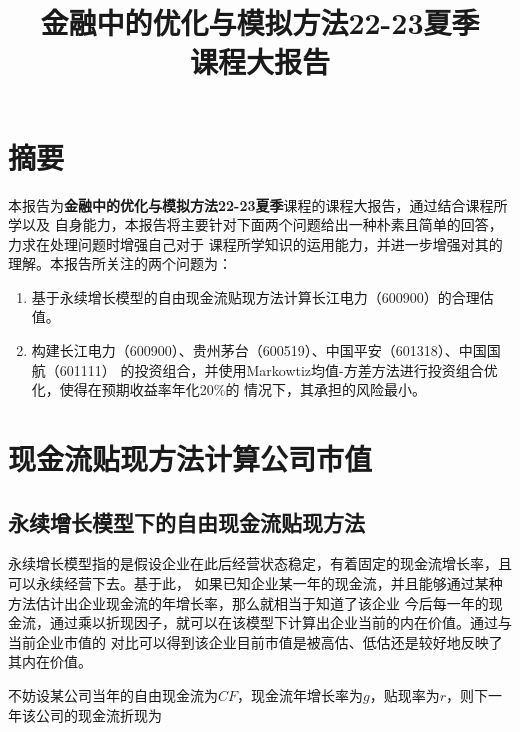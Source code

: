\documentclass[UTF8]{ctexart}
\numberwithin{figure}{section}
\numberwithin{table}{section}
\numberwithin{equation}{section}
\begin{document}
    \title{
        \vskip 2cm \huge 金融中的优化与模拟方法22-23夏季 \\  
                    \huge 课程大报告 \\ 
                }

        \date{}
    \maketitle
    \clearpage

    \tableofcontents
    \clearpage

\section{摘要}
        本报告为\textbf{金融中的优化与模拟方法22-23夏季}课程的课程大报告，通过结合课程所学以及
    自身能力，本报告将主要针对下面两个问题给出一种朴素且简单的回答，力求在处理问题时增强自己对于
    课程所学知识的运用能力，并进一步增强对其的理解。本报告所关注的两个问题为：

        \begin{enumerate}
            \item 基于永续增长模型的自由现金流贴现方法计算长江电力（600900）的合理估值。
            \item 构建长江电力（600900）、贵州茅台（600519）、中国平安（601318）、中国国航（601111）
            的投资组合，并使用Markowtiz均值-方差方法进行投资组合优化，使得在预期收益率年化20\%的
            情况下，其承担的风险最小。
        \end{enumerate}



\section{现金流贴现方法计算公司市值}
    \subsection{永续增长模型下的自由现金流贴现方法}
        永续增长模型指的是假设企业在此后经营状态稳定，有着固定的现金流增长率，且可以永续经营下去。基于此，
    如果已知企业某一年的现金流，并且能够通过某种方法估计出企业现金流的年增长率，那么就相当于知道了该企业
    今后每一年的现金流，通过乘以折现因子，就可以在该模型下计算出企业当前的内在价值。通过与当前企业市值的
    对比可以得到该企业目前市值是被高估、低估还是较好地反映了其内在价值。

        不妨设某公司当年的自由现金流为$CF$，现金流年增长率为$g$，贴现率为$r$，则下一年该公司的现金流折现为
\end{document}
